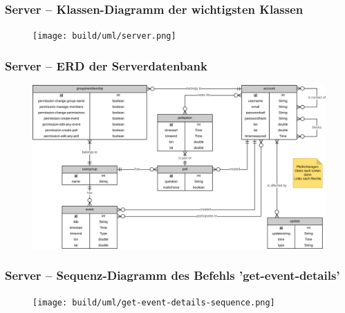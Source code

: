 \documentclass[aspectratio=1610]{beamer}
\begin{document}

	\begin{frame}[plain]
        \frametitle{\textbf{Server} -- Klassen-Diagramm der wichtigsten Klassen}
        \begin{figure}[!htb]
            \centering
            \texttt{[image: build/uml/server.png]}
        \end{figure}
	\end{frame}

	\begin{frame}[plain]
        \frametitle{\textbf{Server} -- ERD der Serverdatenbank}
        \begin{figure}[!htb]
            \centering
            \includegraphics[width = \columnwidth]{images/erd-complete.png}
        \end{figure}
    \end{frame}

	\begin{frame}[plain]
        \frametitle{\textbf{Server} -- Sequenz-Diagramm des Befehls 'get-event-details'}
        \begin{figure}[!htb]
            \centering
            \texttt{[image: build/uml/get-event-details-sequence.png]}
        \end{figure}
    \end{frame}


\end{document}
